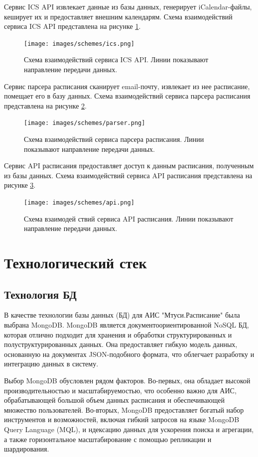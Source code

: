 Сервис ICS API извлекает данные из базы данных, генерирует
iCalendar-файлы, кеширует их и предоставляет внешним календарям.
Схема взаимодействий сервиса ICS API представлена на рисунке \ref{fig:schemes:ics}.

\begin{figure}
  \centering
  \texttt{[image: images/schemes/ics.png]}
  \caption{Схема взаимодействий сервиса ICS API. Линии показывают направление передачи данных.}
  \label{fig:schemes:ics}
\end{figure}

Сервис парсера расписания сканирует email-почту, извлекает из нее расписание, помещает его в базу данных.
Схема взаимодействий сервиса парсера расписания представлена на рисунке \ref{fig:schemes:parser}.

\begin{figure}
  \centering
  \texttt{[image: images/schemes/parser.png]}
  \caption{Схема взаимодействий сервиса парсера расписания. Линии показывают направление передачи данных.}
  \label{fig:schemes:parser}
\end{figure}

Сервис API расписания предоставляет доступ к данным расписания,
полученным из базы данных. Схема взаимодействий сервиса API расписания представлена на рисунке \ref{fig:schemes:api}.

\begin{figure}
  \centering
  \texttt{[image: images/schemes/api.png]}
  \caption{Схема взаимодей ствий сервиса API расписания. Линии показывают направление передачи данных.}
  \label{fig:schemes:api}
\end{figure}

\section{Технологический стек}

\subsection{Технология БД}
В качестве технологии базы данных (БД) для АИС "Мтуси.Расписание"
была выбрана MongoDB. MongoDB является документоориентированной NoSQL БД,
которая отлично подходит для хранения и
обработки структурированных и полуструктурированных данных.
Она предоставляет гибкую модель данных,
основанную на документах JSON-подобного формата,
что облегчает разработку и интеграцию данных в систему.

Выбор MongoDB обусловлен рядом факторов. Во-первых, она обладает высокой производительностью и масштабируемостью,
что особенно важно для АИС, обрабатывающей большой объем данных расписания и обеспечивающей множество пользователей.
Во-вторых, MongoDB предоставляет богатый набор инструментов и возможностей,
включая гибкий запросов на языке MongoDB Query Language (MQL), и
ндексацию данных для ускорения поиска и агрегации, а также горизонтальное
масштабирование с помощью репликации и шардирования.

